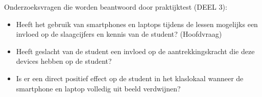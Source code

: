 Onderzoeksvragen die worden beantwoord door praktijktest (DEEL 3):
\begin{itemize}
	\item Heeft het gebruik van smartphones en laptops tijdens de lessen mogelijks een invloed op de slaagcijfers en kennis van de student? (Hoofdvraag)
	\item Heeft geslacht van de student een invloed op de aantrekkingskracht die deze devices hebben op de student?
	\item Is er een direct positief effect op de student in het klaslokaal wanneer de smartphone en laptop volledig uit beeld verdwijnen?
\end{itemize}



